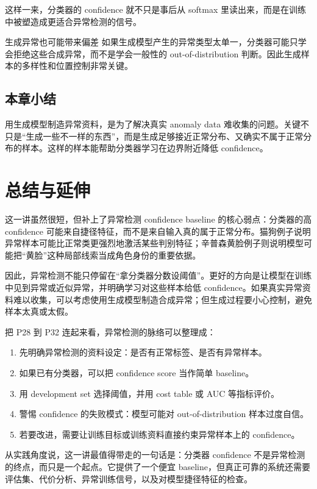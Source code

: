 \documentclass[a4paper]{article}
\begin{document}
这样一来，分类器的 confidence 就不只是事后从 softmax 里读出来，而是在训练中被塑造成更适合异常检测的信号。

\begin{warningbox}{生成异常也可能带来偏差}
    如果生成模型产生的异常类型太单一，分类器可能只学会拒绝这些合成异常，而不是学会一般性的 out-of-distribution 判断。因此生成样本的多样性和位置控制非常关键。
\end{warningbox}

\subsection{本章小结}

用生成模型制造异常资料，是为了解决真实 anomaly data 难收集的问题。关键不只是“生成一些不一样的东西”，而是生成足够接近正常分布、又确实不属于正常分布的样本。这样的样本能帮助分类器学习在边界附近降低 confidence。

\section{总结与延伸}

这一讲虽然很短，但补上了异常检测 confidence baseline 的核心弱点：分类器的高 confidence 可能来自捷径特征，而不是来自输入真的属于正常分布。猫狗例子说明异常样本可能比正常类更强烈地激活某些判别特征；辛普森黄脸例子则说明模型可能把“黄脸”这种局部线索当成角色身份的重要依据。

因此，异常检测不能只停留在“拿分类器分数设阈值”。更好的方向是让模型在训练中见到异常或近似异常，并明确学习对这些样本给低 confidence。如果真实异常资料难以收集，可以考虑使用生成模型制造合成异常；但生成过程要小心控制，避免样本太真或太假。

把 P28 到 P32 连起来看，异常检测的脉络可以整理成：
\begin{enumerate}
    \item 先明确异常检测的资料设定：是否有正常标签、是否有异常样本。
    \item 如果已有分类器，可以把 confidence score 当作简单 baseline。
    \item 用 development set 选择阈值，并用 cost table 或 AUC 等指标评价。
    \item 警惕 confidence 的失败模式：模型可能对 out-of-distribution 样本过度自信。
    \item 若要改进，需要让训练目标或训练资料直接约束异常样本上的 confidence。
\end{enumerate}

从实践角度说，这一讲最值得带走的一句话是：分类器 confidence 不是异常检测的终点，而只是一个起点。它提供了一个便宜 baseline，但真正可靠的系统还需要评估集、代价分析、异常训练信号，以及对模型捷径特征的检查。
\end{document}
